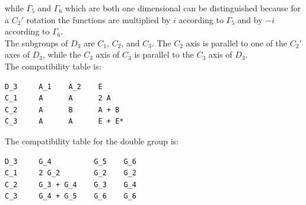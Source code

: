 \documentclass[12pt,a4paper]{article}
\begin{document}
while $\Gamma_5$ and $\Gamma_6$ which are both one dimensional can be distinguished
because for a $C_2'$ rotation the functions are multiplied by $i$ according to
$\Gamma_5$ and by $-i$ according to $\Gamma_6$. \\
The subgroups of $D_3$ are $C_1$, $C_2$, and $C_3$. The $C_2$ axis is 
parallel to one of the $C_2'$ axes of $D_3$, while the $C_3$ axis 
of $C_3$ is parallel to the $C_3$ axis of $D_3$. \\
The compatibility table is:
\begin{verbatim}
D_3     A_1    A_2    E    
C_1     A      A      2 A      
C_2     A      B      A + B        
C_3     A      A      E + E*      
\end{verbatim}
The compatibility table for the double group is:
\begin{verbatim}
D_3     G_4          G_5    G_6    
C_1     2 G_2        G_2    G_2
C_2     G_3 + G_4    G_3    G_4
C_3     G_4 + G_5    G_6    G_6   
\end{verbatim}

\newpage
\end{document}
